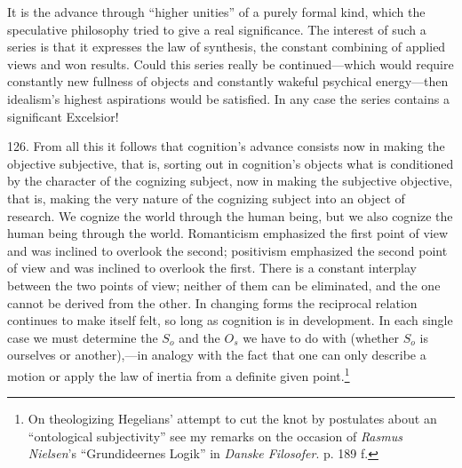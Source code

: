 \documentclass[12pt,a4paper]{book}
\newcommand{\opage}[1]{\marginnote{\footnotesize\textit{[#1]}}}
\begin{document}
It is the advance through ``higher unities'' of a purely formal kind, which the
speculative philosophy tried to give a real significance. The interest of such a series is
that it expresses the law of synthesis, the constant combining of applied views and won
results. Could this series really be continued---which would require constantly new fullness
of objects and constantly wakeful psychical energy---then idealism's highest aspirations
would be satisfied. In any case the series contains a significant Excelsior!

126. From all this it follows that cognition's advance \opage{301}consists now in making the objective
subjective, that is, sorting out in cognition's objects what is conditioned by the character
of the cognizing subject, now in making the subjective objective, that is, making the very
nature of the cognizing subject into an object of research. We cognize the world through
the human being, but we also cognize the human being through the world. Romanticism
emphasized the first point of view and was inclined to overlook the second; positivism
emphasized the second point of view and was inclined to overlook the first. There is a
constant interplay between the two points of view; neither of them can be eliminated, and
the one cannot be derived from the other. In changing forms the reciprocal relation continues to make
itself felt, so long as cognition is in development. In each single case we must determine
the $S_o$ and the $O_s$ we have to do with (whether $S_o$ is ourselves or another),---in
analogy with the fact that one can only describe a motion or apply the law of inertia from a
definite given point.\footnote{On theologizing Hegelians' attempt to cut the knot by
postulates about an ``ontological subjectivity'' see my remarks on the occasion of
\emph{Rasmus Nielsen}'s ``Grundideernes Logik'' in \emph{Danske Filosofer}. p. 189 f.}
\end{document}
